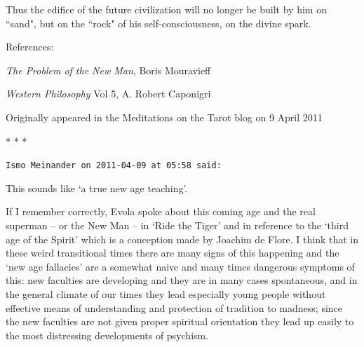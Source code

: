 \begin{quotex}
Thus the edifice of the future civilization will no longer be built by him on ``sand", but on the ``rock" of his self-consciousness, on the divine spark. 

\end{quotex}
References:

\emph{The Problem of the New Man}, Boris Mouravieff

\emph{Western Philosophy} Vol 5, A. Robert Caponigri

Originally appeared in the Meditations on the Tarot blog on 9 April 2011




\begin{center}* * *\end{center}

\begin{footnotesize}\begin{sffamily}



\texttt{Ismo Meinander on 2011-04-09 at 05:58 said: }

This sounds like `a true new age teaching'.

If I remember correctly, Evola spoke about this coming age and the real superman – or the New Man – in `Ride the Tiger' and in reference to the `third age of the Spirit' which is a conception made by Joachim de Flore. I think that in these weird transitional times there are many signs of this happening and the `new age fallacies' are a somewhat naive and many times dangerous symptoms of this: new faculties are developing and they are in many cases spontaneous, and in the general climate of our times they lead especially young people without effective means of understanding and protection of tradition to madness; since the new faculties are not given proper spiritual orientation they lead up easily to the most distressing developments of psychism.


\hfill


\end{sffamily}\end{footnotesize}
